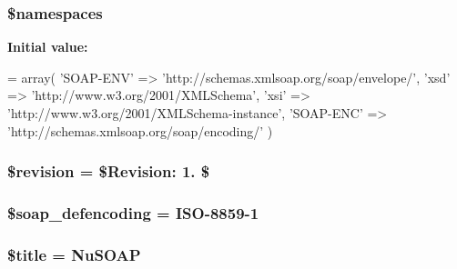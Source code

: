 \subsubsection[{\$namespaces}]{\setlength{\rightskip}{0pt plus 5cm}\$namespaces}\label{classnusoap__base_a5a7d9500de9f7c938443d65cef9a074e}
{\bfseries Initial value\+:}
\begin{DoxyCode}
= array(
        \textcolor{stringliteral}{'SOAP-ENV'} => \textcolor{stringliteral}{'http://schemas.xmlsoap.org/soap/envelope/'},
        \textcolor{stringliteral}{'xsd'} => \textcolor{stringliteral}{'http://www.w3.org/2001/XMLSchema'},
        \textcolor{stringliteral}{'xsi'} => \textcolor{stringliteral}{'http://www.w3.org/2001/XMLSchema-instance'},
        \textcolor{stringliteral}{'SOAP-ENC'} => \textcolor{stringliteral}{'http://schemas.xmlsoap.org/soap/encoding/'}
        )
\end{DoxyCode}
\hypertarget{classnusoap__base_a4ff96b89e7ea5fa55acb086ecb6d0c03}{}
\subsubsection[{\$revision}]{\setlength{\rightskip}{0pt plus 5cm}\$revision = \textquotesingle{}\$Revision\+: 1. \$\textquotesingle{}}\label{classnusoap__base_a4ff96b89e7ea5fa55acb086ecb6d0c03}
\hypertarget{classnusoap__base_a54cf9ddad3b51e54af1bfad78efad09a}{}
\subsubsection[{\$soap\+\_\+defencoding}]{\setlength{\rightskip}{0pt plus 5cm}\${\bf soap\+\_\+defencoding} = \textquotesingle{}I\+S\+O-\/8859-\/1\textquotesingle{}}\label{classnusoap__base_a54cf9ddad3b51e54af1bfad78efad09a}
\hypertarget{classnusoap__base_ada57e7bb7c152edad18fe2f166188691}{}
\subsubsection[{\$title}]{\setlength{\rightskip}{0pt plus 5cm}\$title = \textquotesingle{}Nu\+S\+O\+A\+P\textquotesingle{}}\label{classnusoap__base_ada57e7bb7c152edad18fe2f166188691}
\hypertarget{classnusoap__base_abc776370d77b6fe463a62fa2faf26c2e}{}

